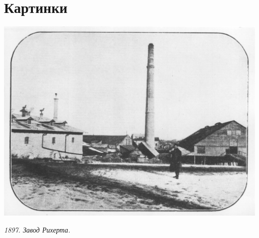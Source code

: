 \chapter{Картинки}

\vspace*{\fill}
\begin{center}
\includegraphics[width=\linewidth]{pix/1897-rihert-kirp.jpg}

\textit{1897. Завод Рихерта.}
\end{center} 
\vspace*{\fill}
\newpage
\vspace*{\fill}
